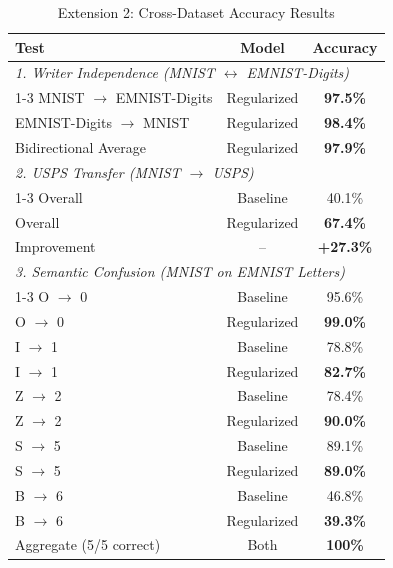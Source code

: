 
\begin{table}[h]
\centering
\caption{Extension 2: Cross-Dataset Accuracy Results}
\label{tab:extension2_accuracy}
\begin{tabular}{lcc}
\toprule
\textbf{Test} & \textbf{Model} & \textbf{Accuracy} \\
\midrule
\multicolumn{3}{l}{\textit{1. Writer Independence (MNIST $\leftrightarrow$ EMNIST-Digits)}} \\
\cmidrule(lr){1-3}
MNIST $\rightarrow$ EMNIST-Digits & Regularized & \textbf{97.5\%} \\
EMNIST-Digits $\rightarrow$ MNIST & Regularized & \textbf{98.4\%} \\
Bidirectional Average & Regularized & \textbf{97.9\%} \\
\midrule
\multicolumn{3}{l}{\textit{2. USPS Transfer (MNIST $\rightarrow$ USPS)}} \\
\cmidrule(lr){1-3}
Overall & Baseline & 40.1\% \\
Overall & Regularized & \textbf{67.4\%} \\
Improvement & -- & \textbf{+27.3\%} \\
\midrule
\multicolumn{3}{l}{\textit{3. Semantic Confusion (MNIST on EMNIST Letters)}} \\
\cmidrule(lr){1-3}
O $\rightarrow$ 0 & Baseline & 95.6\% \\
O $\rightarrow$ 0 & Regularized & \textbf{99.0\%} \\
I $\rightarrow$ 1 & Baseline & 78.8\% \\
I $\rightarrow$ 1 & Regularized & \textbf{82.7\%} \\
Z $\rightarrow$ 2 & Baseline & 78.4\% \\
Z $\rightarrow$ 2 & Regularized & \textbf{90.0\%} \\
S $\rightarrow$ 5 & Baseline & 89.1\% \\
S $\rightarrow$ 5 & Regularized & \textbf{89.0\%} \\
B $\rightarrow$ 6 & Baseline & 46.8\% \\
B $\rightarrow$ 6 & Regularized & \textbf{39.3\%} \\
Aggregate (5/5 correct) & Both & \textbf{100\%} \\
\bottomrule
\end{tabular}
\end{table}
